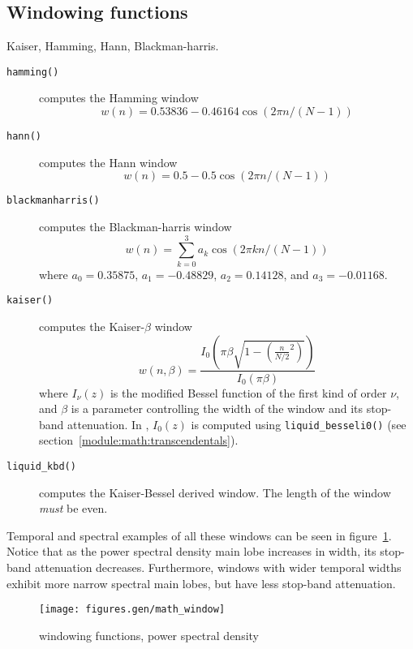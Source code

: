 \subsection{Windowing functions}
Kaiser, Hamming, Hann, Blackman-harris.

\begin{description}
\item[{\tt hamming()}]
    computes the Hamming window
    \[
        w(n) = 0.53836 - 0.46164 \cos\left( 2 \pi n / (N-1) \right)
    \]
\item[{\tt hann()}]
    computes the Hann window
    \[
        w(n) = 0.5 - 0.5 \cos\left( 2 \pi n / (N-1) \right)
    \]
\item[{\tt blackmanharris()}]
    computes the Blackman-harris window
    \[
        w(n) = \sum_{k=0}^{3} { a_k \cos\left( 2 \pi k n / (N-1)\right) }
    \]
    where
    $a_0 =  0.35875$,
    $a_1 = -0.48829$,
    $a_2 =  0.14128$, and
    $a_3 = -0.01168$.
\item[{\tt kaiser()}]
    computes the Kaiser-$\beta$ window
    \[
        w(n,\beta) = \frac{
            I_0\left(\pi\beta\sqrt{1-\left(\frac{n}{N/2}^2\right)}\right)
        }{
            I_0\left(\pi\beta\right)
        }
    \]
    where $I_\nu(z)$ is the modified Bessel function of the first kind of
    order $\nu$, and $\beta$ is a parameter controlling the width of the
    window and its stop-band attenuation.
    In \liquid, $I_0(z)$ is computed using {\tt liquid\_besseli0()} (see
    section~\ref{module:math:transcendentals}).
\item[{\tt liquid\_kbd()}]
    computes the Kaiser-Bessel derived window.
    The length of the window {\em must} be even.
\end{description}

Temporal and spectral examples of all these windows can be seen in
figure~\ref{fig:module:math:window}.
Notice that as the power spectral density main lobe increases in width, its
stop-band attenuation decreases.
Furthermore, windows with wider temporal widths exhibit more narrow spectral
main lobes, but have less stop-band attenuation.

\begin{figure}
\centering
  \texttt{[image: figures.gen/math\_window]}
\caption{windowing functions, power spectral density}
\label{fig:module:math:window}
\end{figure}

